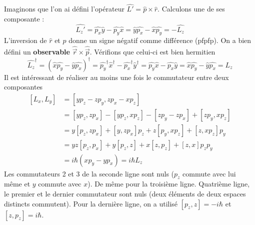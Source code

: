 	Imaginons que l'on ai défini l'opérateur $\hat{L'}=\hat{p}\times\hat{r}$. Calculons une de 
	ses composante :
	\begin{equation}
	\hat{L_z'} = \hat{p_x}\hat{y}-\hat{p_y}\hat{x} = \hat{y}\hat{p_x}-\hat{x}\hat{p_y}=-\hat{L_z}
	\end{equation}
	L'inversion de $\hat{r}$ et $\hat{p}$ donne un signe négatif comme différence (pfpfp). On a bien 
	défini un \textbf{observable} $\hat{\vec{r}}\times\hat{\vec{p}}$. Vérifions que celui-ci est bien
	hermitien
	\begin{equation}
	\hat{L_z}^\dagger = (\hat{x}\hat{p_y}-\hat{y}\hat{p_x})^\dagger = \hat{p_y}^\dagger\hat{x}^\dagger
	-\hat{p_x}^\dagger\hat{y}^\dagger=\hat{p_y}\hat{x}-\hat{p_x}\hat{y} = \hat{x}\hat{p_y}-\hat{y}
	\hat{p_x} = L_z
	\end{equation}
	Il est intéressant de réaliser au moins une fois le commutateur entre deux composantes
	\begin{equation}
	\begin{array}{ll}
	[L_x,L_y] &= [yp_z-zp_y, zp_x-xp_z]\\
	&= [yp_z,zp_x]-[yp_z,xp_z]-[zp_y-zp_x]+[zp_y,xp_z]\\
	&=y[p_z,zp_x]+[y,zp_x]p_z+z[p_y,xp_z]+[z,xp_z]p_y\\
	&= yz[p_z,p_x]+y[p_z,z]+x[z,p_z]+[z,x]p_zp_y\\
	&= i\hbar(xp_y-yp_x) = i\hbar L_z
	\end{array}
	\end{equation}
	Les commutateurs 2 et 3 de la seconde ligne sont nuls ($p_z$ commute avec lui même et $y$ 
	commute avec $x$). De même pour la troisième ligne. Quatrième ligne, le premier et le dernier 
	commutateur sont nuls (deux éléments de deux espaces distincts commutent). Pour la dernière 
	ligne, on a utilisé $[p_z,z] = -i\hbar$ et $[z,p_z]=i\hbar$.\\
	
